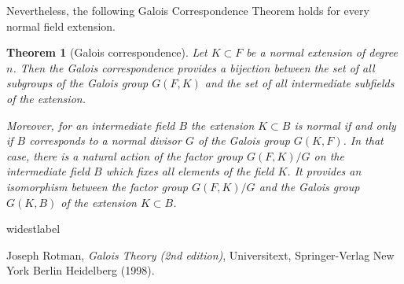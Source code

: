 \documentclass[11pt]{article}
\theoremstyle{plain}
\newtheorem{theorem}{Theorem}[section]
\theoremstyle{definition}
\begin{document}
Nevertheless, the following Galois Correspondence Theorem holds for every normal field extension.

\begin{theorem}[Galois correspondence] \label{genGalcor} Let $K\subset F$ be a normal extension of degree $n$. Then the Galois correspondence provides a bijection between the set of all subgroups of the Galois group $G(F,K)$ and the set of all intermediate subfields of the extension.

Moreover, for an intermediate field $B$ the extension $K\subset B$ is normal if and only if $B$ corresponds to a normal divisor $G$ of the Galois group $G(K,F)$. In that case, there is a natural action  of  the factor group $G(F,K)/G$
on the intermediate field $B$ which  fixes all elements of the field $K$. It provides an isomorphism between the factor group $G(F,K)/G$  and the
Galois group $G(K,B)$ of the extension $K\subset B$.
 \end{theorem}


\begin{thebibliography}{widestlabel}

  Joseph Rotman, {\it Galois Theory (2nd edition)}, Universitext, Springer-Verlag New York Berlin Heidelberg (1998).
 \end{thebibliography}
\end{document}
